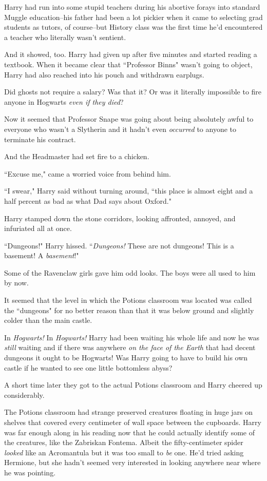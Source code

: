 Harry had run into some stupid teachers during his abortive forays into standard Muggle education\---his father had been a lot pickier when it came to selecting grad students as tutors, of course\---but History class was the first time he'd encountered a teacher who literally wasn't sentient.

And it showed, too. Harry had given up after five minutes and started reading a textbook. When it became clear that ``Professor Binns" wasn't going to object, Harry had also reached into his pouch and withdrawn earplugs.

Did ghosts not require a salary? Was that it? Or was it literally impossible to fire anyone in Hogwarts \emph{even if they died}?

Now it seemed that Professor Snape was going about being absolutely awful to everyone who wasn't a Slytherin and it hadn't even \emph{occurred} to anyone to terminate his contract.

And the Headmaster had set fire to a chicken.

``Excuse me," came a worried voice from behind him.

``I swear," Harry said without turning around, ``this place is almost eight and a half percent as bad as what Dad says about Oxford."

\later

Harry stamped down the stone corridors, looking affronted, annoyed, and infuriated all at once.

``Dungeons!" Harry hissed. ``\emph{Dungeons!} These are not dungeons! This is a basement! A \emph{basement}!"

Some of the Ravenclaw girls gave him odd looks. The boys were all used to him by now.

It seemed that the level in which the Potions classroom was located was called the ``dungeons" for no better reason than that it was below ground and slightly colder than the main castle.

In \emph{Hogwarts!} In \emph{Hogwarts!} Harry had been waiting his whole life and now he was \emph{still} waiting and if there was anywhere \emph{on the face of the Earth} that had decent dungeons it ought to be Hogwarts! Was Harry going to have to build his own castle if he wanted to see one little bottomless abyss?

A short time later they got to the actual Potions classroom and Harry cheered up considerably.

The Potions classroom had strange preserved creatures floating in huge jars on shelves that covered every centimeter of wall space between the cupboards. Harry was far enough along in his reading now that he could actually identify some of the creatures, like the Zabriskan Fontema. Albeit the fifty-centimeter spider \emph{looked} like an Acromantula but it was too small to \emph{be} one. He'd tried asking Hermione, but she hadn't seemed very interested in looking anywhere near where he was pointing.

